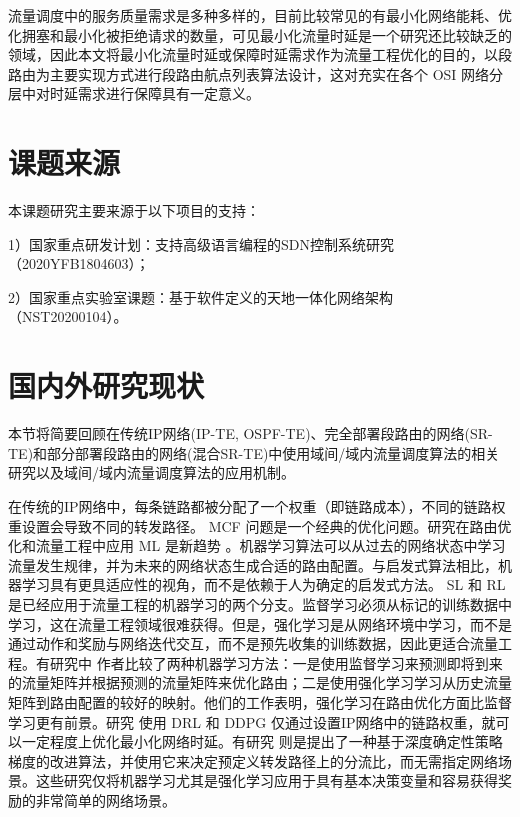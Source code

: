 流量调度中的服务质量需求是多种多样的，目前比较常见的有最小化网络能耗、优化拥塞和最小化被拒绝请求的数量，可见最小化流量时延是一个研究还比较缺乏的领域，因此本文将最小化流量时延或保障时延需求作为流量工程优化的目的，以段路由为主要实现方式进行段路由航点列表算法设计，这对充实在各个 \gls*{OSI} 网络分层中对时延需求进行保障具有一定意义。

\section{课题来源}
本课题研究主要来源于以下项目的支持：

1）国家重点研发计划：支持高级语言编程的SDN控制系统研究（2020YFB1804603）；

2）国家重点实验室课题：基于软件定义的天地一体化网络架构（NST20200104）。

\section{国内外研究现状}

本节将简要回顾在传统IP网络(IP-TE, OSPF-TE)、完全部署段路由的网络(SR-TE)和部分部署段路由的网络(混合SR-TE)中使用域间/域内流量调度算法的相关研究以及域间/域内流量调度算法的应用机制。

在传统的IP网络中，每条链路都被分配了一个权重（即链路成本），不同的链路权重设置会导致不同的转发路径。 \gls*{MCF} 问题是一个经典的优化问题。研究在路由优化和流量工程中应用 \gls*{ML} 是新趋势 \cite{MLALNET} 。机器学习算法可以从过去的网络状态中学习流量发生规律，并为未来的网络状态生成合适的路由配置。与启发式算法相比，机器学习具有更具适应性的视角，而不是依赖于人为确定的启发式方法。 \gls*{SL} 和 \gls*{RL} 是已经应用于流量工程的机器学习的两个分支。监督学习必须从标记的训练数据中学习，这在流量工程领域很难获得。但是，强化学习是从网络环境中学习，而不是通过动作和奖励与网络迭代交互，而不是预先收集的训练数据，因此更适合流量工程。有研究中 \cite{MLALNET} 作者比较了两种机器学习方法：一是使用监督学习来预测即将到来的流量矩阵并根据预测的流量矩阵来优化路由；二是使用强化学习学习从历史流量矩阵到路由配置的较好的映射。他们的工作表明，强化学习在路由优化方面比监督学习更有前景。研究 \cite{MLSR2} 使用 \gls*{DRL} 和 \gls*{DDPG} \cite{MLSR3} 仅通过设置IP网络中的链路权重，就可以一定程度上优化最小化网络时延。有研究 \cite{MLSR1} 则是提出了一种基于深度确定性策略梯度的改进算法，并使用它来决定预定义转发路径上的分流比，而无需指定网络场景。这些研究仅将机器学习尤其是强化学习应用于具有基本决策变量和容易获得奖励的非常简单的网络场景。

